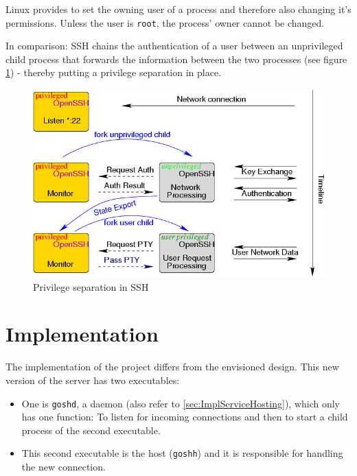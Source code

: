 \documentclass[10pt,a4paper,titlepage,twoside,english,final]{zhawreprt}
\begin{document}
\gls{Linux} provides \cite{setuid} to set the owning user of a process and therefore also changing it's permissions.
Unless the user is \texttt{root}, the process' owner cannot be changed.

In comparison: \gls{SSH} chains the authentication of a user between an unprivileged child process that forwards the information between the two processes (see figure \ref{fig:PrivilegeSeparationInSSH}) - thereby putting a privilege separation in place.

\begin{figure}[ht]
\includegraphics[width=\textwidth]{priv}
\caption{Privilege separation in SSH \citep{ProvosSSHPriv}}
\label{fig:PrivilegeSeparationInSSH}
\end{figure}


\chapter{Implementation}\label{chp:Implementation}
The implementation of the project differs from the envisioned design.
This new version of the server has two executables:

\begin{itemize}
\item One is \texttt{goshd}, a \gls{daemon} (also refer to \ref{sec:ImplServiceHosting}), which only has one function:
To listen for incoming connections and then to start a child process of the second executable.
\item This second executable is the host (\texttt{goshh}) and it is responsible for handling the new connection.
\end{itemize}
\end{document}
